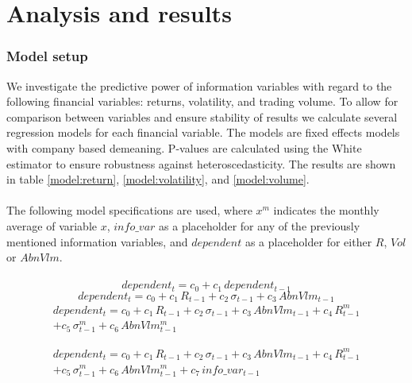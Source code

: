 
\chapter{Analysis and results}
\subsection{Model setup}
We investigate the predictive power of information variables with regard to the following financial variables: returns, volatility, and trading volume. To allow for comparison between variables and ensure stability of results we calculate several regression models for each financial variable. The models are fixed effects models with company based demeaning. P-values are calculated using the White estimator to ensure robustness against heteroscedasticity. The results are shown in table \ref{model:return}, \ref{model:volatility}, and \ref{model:volume}.
\\\\
The following model specifications are used, where $x^{m}$ indicates the monthly average of variable $x$, $info\_var$ as a placeholder for any of the previously mentioned information variables, and $dependent$ as a placeholder for either $R$, $Vol$ or $AbnVlm$.
\\\\
\begin{equation}
\label{eqOneDependent}
    dependent_t = c_0 + c_1\,dependent_{t-1}
\end{equation}
\begin{equation}
    dependent_t = c_0 + c_1\,R_{t-1}+c_2\,\sigma_{t-1}+c_3\,AbnVlm_{t-1}
\end{equation}
\begin{equation}
\begin{split}
    dependent_t = c_0 + c_1\,R_{t-1}+c_2\,\sigma_{t-1}+c_3\,AbnVlm_{t-1}+c_4\,R_{t-1}^m\\
    +c_5\,\sigma_{t-1}^m+c_6\,AbnVlm_{t-1}^m
\end{split}
\end{equation}

\begin{equation}
\begin{split}
    dependent_t = c_0 +  c_1\,R_{t-1}+c_2\,\sigma_{t-1}+c_3\,AbnVlm_{t-1}+c_4\,R_{t-1}^m\\
    +c_5\,\sigma_{t-1}^m+c_6\,AbnVlm_{t-1}^m+c_7\,info\_var_{t-1}
\end{split}
\end{equation}

